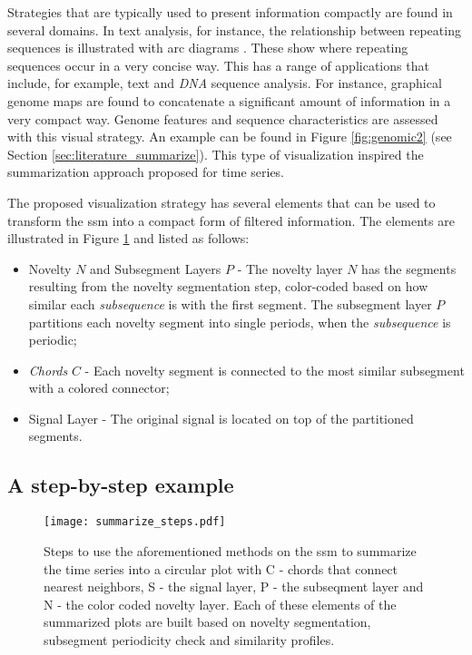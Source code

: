 Strategies that are typically used to present information compactly are found in several domains. In text analysis, for instance, the relationship between repeating sequences is illustrated with arc diagrams \cite{bitmap, arcplots}. These show where repeating sequences occur in a very concise way. This has a range of applications that include, for example, text and \textit{DNA} sequence analysis. For instance, graphical genome maps are found to concatenate a significant amount of information in a very compact way. Genome features and sequence characteristics are assessed with this visual strategy. An example can be found in Figure \ref{fig:genomic2} (see Section \ref{sec:literature_summarize}). This type of visualization inspired the summarization approach proposed for time series.
\par
The proposed visualization strategy has several elements that can be used to transform the \gls{ssm} into a compact form of filtered information. The elements are  illustrated in Figure \ref{fig:summarize_steps} and listed as follows:
\begin{itemize}
	\item Novelty $N$ and Subsegment Layers $P$ - The novelty layer $N$ has the segments resulting from the novelty segmentation step, color-coded based on how similar each \textit{subsequence} is with the first segment. The subsegment layer $P$ partitions each novelty segment into single periods, when the \textit{subsequence} is periodic;
	\item \textit{Chords} $C$ - Each novelty segment is connected to the most similar subsegment with a colored connector;
	\item Signal Layer - The original signal is located on top of the partitioned segments.
\end{itemize}


\subsection{A step-by-step example}

\begin{figure}
\centering
\texttt{[image: summarize\_steps.pdf]}
\caption{Steps to use the aforementioned methods on the \gls{ssm} to summarize the time series into a circular plot with C - chords that connect nearest neighbors, S - the signal layer, P - the subseqment layer and N - the color coded novelty layer. Each of these elements of the summarized plots are built based on novelty segmentation, subsegment periodicity check and similarity profiles.}
\label{fig:summarize_steps}
\end{figure}

